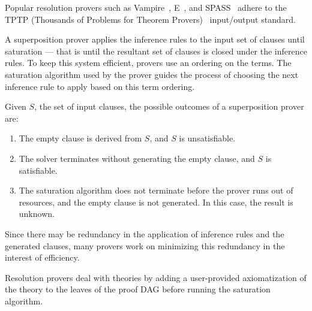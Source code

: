 \documentclass{article}
\begin{document}
		Popular resolution provers such as
		Vampire~\cite{10.1007/978-3-642-39799-8_1}, 
		E~\cite{10.5555/1218615.1218621}, and 
		SPASS~\cite{10.1007/978-3-642-02959-2_10} adhere 
		to the TPTP (Thousands of Problems 
		for Theorem 
		Provers)~\cite{Sut17} input/output standard.

		A superposition prover applies the inference 
		rules to the input set of 
		clauses until saturation --- that is until the 
		resultant set of clauses is closed under the 
		inference rules. To keep this system
		efficient, provers use an ordering 
		on the terms. The saturation algorithm used 
		by the prover guides the process of choosing 
		the next inference rule to apply based on this 
		term ordering. 

		Given $S$, the set of input clauses, the possible 
		outcomes of a superposition prover are:
		\begin{enumerate}
		\item The empty clause is derived from $S$, and
			$S$ is unsatisfiable.
		\item The solver terminates without generating the 
			empty clause, and $S$ is satisfiable.
		\item The saturation algorithm does not terminate 
			before the prover runs out of resources, and 
			the empty clause is not generated. In this 
			case, the result is unknown. 
		\end{enumerate}

		Since there may be redundancy in the application 
		of inference rules and the generated clauses, 
		many provers work on minimizing this redundancy 
		in the interest of efficiency.

		Resolution provers deal with theories by 
		adding a user-provided axiomatization of the 
		theory to the leaves of the proof DAG before 
		running the saturation algorithm.
	
\end{document}
